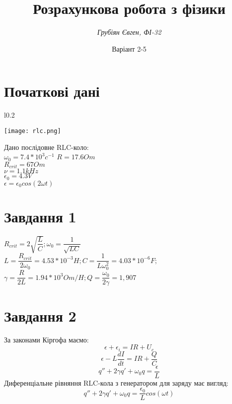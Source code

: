 \documentclass[a4paper,12pt]{article}
\title{{\color{MidnightBlue}\textbf{Розрахункова робота з фізики}}}
\author{{\color{Sepia}\textit{Грубіян Євген, ФІ-32}}}
\date{Варіант 2-5}
\begin{document}
\maketitle
\section*{Початкові дані}
\begin{wrapfigure}{l}{0.2\textwidth}
  \begin{center}
    \texttt{[image: rlc.png]}
  \end{center}
\end{wrapfigure}
Дано послідовне RLC-коло:\\
\medskip
\( \omega_0 = 7.4 * 10^3c^{-1} \) \newline
\medskip
\( R = 17.6 Om\) \\
\medskip
\( R_{crit} = 67 Om \) \\
\medskip
\( \nu = 1.1 kHz\) \\
\medskip
\( \epsilon_0 = 4.3 V \) \\
\medskip
\( \epsilon = \epsilon_{0}cos(2\omega t)\)
\section*{Завдання 1}
\( R_{crit} = 2\sqrt{\dfrac{L}{C}}; \omega_0=\dfrac{1}{\sqrt{LC}}\) \\
\medskip
\( L = \dfrac{R_{crit}}{2\omega_0} = 4.53 * 10^{-3} H; C = \dfrac{1}{L\omega_0^2} = 4.03 * 10^{-6} F;\) \\ 
\medskip 
\( \gamma = \dfrac{R}{2L} = 1.94 * 10^3 Om/H; Q = \dfrac{\omega_0}{2\gamma} = 1,907 \) \\
\newline
\newline
\newline
\section*{Завдання 2}
\hspace*{\parindent}За законами Кіргофа маємо:
\[ \epsilon + \epsilon_i = IR + U_c \]
\[ \epsilon - L\dfrac{dI}{dt} = IR + \dfrac{Q}{C} \]
\[ q'' + 2\gamma q' + \omega_0 q = \dfrac{\epsilon}{L} \]
\hspace*{\parindent}Диференціальне рівняння RLC-кола з генератором для заряду має вигляд:
\[ q'' + 2\gamma q' + \omega_0 q = \dfrac{\epsilon_0}{L}cos(\omega t) \]
\end{document}
